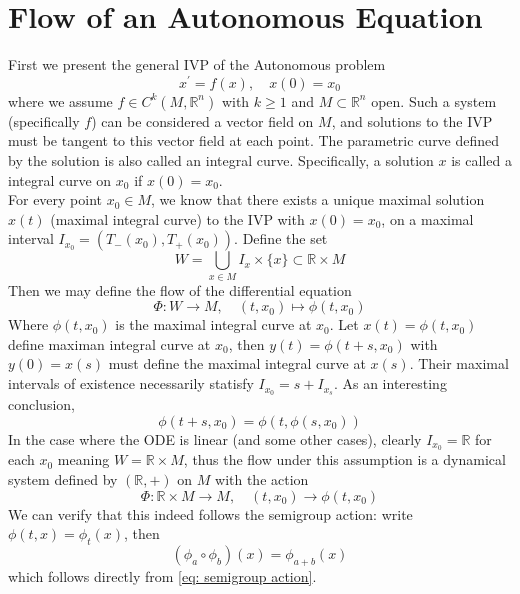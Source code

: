 \documentclass[a4paper, 12pt]{book}
\begin{document}
\section{Flow of an Autonomous Equation}
First we present the general IVP of the Autonomous problem
\begin{equation}
	x^\prime=f(x),\quad x(0)=x_0
	\label{eq:autonomous IVP for flow}
\end{equation}
where we assume \( f\in C^k(M, \mathbb{R}^n) \) with \( k\geq 1 \) and \( M\subset \mathbb{R}^n \) open. Such a system (specifically \( f \)) can be considered a vector field on \( M \), and solutions to the IVP must be tangent to this vector field at each point. The parametric curve defined by the solution is also called an integral curve. Specifically, a solution \( x \) is called a integral curve on \( x_0 \) if \( x(0)=x_0 \). \\

For every point \( x_0\in M \), we know that there exists a unique maximal solution \( x(t) \) (maximal integral curve) to the IVP with \( x(0)=x_0 \), on a maximal interval \( I_{x_0} =(T_-(x_0), T_+(x_0)) \). Define the set \[
	W= \bigcup_{x \in M} I_{x}\times \{x\} \subset \mathbb{R}\times M
\]
Then we may define the flow of the differential equation \[
	\Phi:W\to M, \quad (t,x_0) \mapsto \phi(t,x_0)
\]
Where \( \phi(t,x_0) \) is the maximal integral curve at \( x_0 \). Let \( x(t)=\phi(t,x_0) \) define maximan integral curve at \( x_0 \), then $y(t)=\phi(t+s,x_0)$ with \( y(0)=x(s) \) must define the maximal integral curve at \( x(s) \). Their maximal intervals of existence necessarily statisfy \( I_{x_0} =s+ I_{x_s} \). As an interesting conclusion, \begin{equation}
	\phi(t+s,x_0)=\phi(t, \phi(s,x_0))
	\label{eq: semigroup action}
\end{equation}
In the case where the ODE is linear (and some other cases), clearly \( I_{x_0} = \mathbb{R} \) for each \( x_0 \) meaning \( W=\mathbb{R}\times M \), thus the flow under this assumption is a dynamical system defined by \( (\mathbb{R}, +) \) on \( M \) with the action \[
	\Phi:\mathbb{R}\times M \to M, \quad (t,x_0)\to \phi(t,x_0)
\]
We can verify that this indeed follows the semigroup action: write \( \phi(t,x)=\phi_t(x) \), then \[
	(\phi_a\circ \phi_b ) (x) = \phi_{a+b} (x)
\] which follows directly from \eqref{eq: semigroup action}.\\
\end{document}
